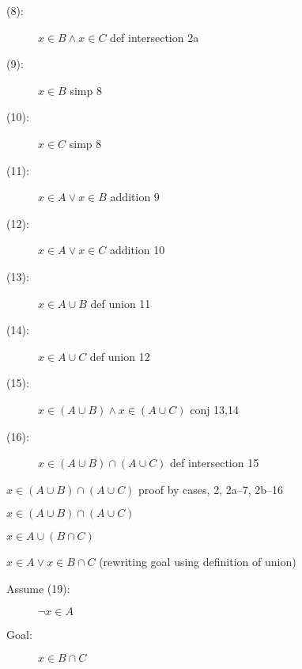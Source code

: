 \documentclass[12pt]{book}
\begin{document}
\begin{description}
\begin{description}
\begin{description}
\item[(8):] $x \in B \wedge x \in C$ def intersection 2a

\item[(9):]  $x \in B$ simp 8

\item[(10):]  $x \in C$ simp 8

\item[(11):]  $x \in A \vee x \in B$  addition 9

\item[(12):]  $x \in A \vee x \in C$  addition 10

\item [(13):]  $x \in A \cup B$ def union 11

\item[(14):]  $x \in A \cup C$  def union 12

\item[(15):]  $x \in  (A \cup B) \wedge x \in (A \cup C)$  conj 13,14

\item[(16):]   $x \in  (A \cup B) \cap  (A \cup C)$ def intersection 15
 

\end{description}

\item[(17):] $x \in  (A \cup B) \cap  (A \cup C)$ proof by cases, 2, 2a--7, 2b--16

\end{description}

\newpage

\item[Part II:]

\begin{description}

\item

\item[Assume (18):]  $x \in  (A \cup B) \cap  (A \cup C)$

\item[Goal:]  $x \in A \cup (B \cap C)$

\item[Goal:]  $x \in A \vee x \in B \cap C$ (rewriting goal using definition of union)

\begin{description}

\item[Assume (19):]  $\neg x \in A$

\item[Goal:]  $x \in B \cap C$


\end{description}
\end{description}
\end{description}
\end{document}
